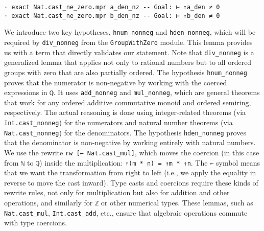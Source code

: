 \begin{example}
\begin{lstlisting}[language=lean]
· exact Nat.cast_ne_zero.mpr a_den_nz -- Goal: ⊢ ↑a_den ≠ 0
· exact Nat.cast_ne_zero.mpr b_den_nz -- Goal: ⊢ ↑b_den ≠ 0
\end{lstlisting}

  We introduce two key hypotheses, \lstinline[language=lean]|hnum_nonneg|
  and \lstinline[language=lean]|hden_nonneg|, which will be required by
  \lstinline[language=lean]|div_nonneg| from the
  \lstinline[language=lean]|GroupWithZero| module.
  This lemma provides us with a term that directly validates our statement.
  Note that \lstinline[language=lean]|div_nonneg| is a generalized lemma that applies
  not only to rational numbers but to all ordered groups with zero that are
  also partially ordered.
  The hypothesis \lstinline[language=lean]|hnum_nonneg| proves that the numerator
  is non-negative by working with the coerced expressions in
  \lstinline[language=lean]|ℚ|. It uses \lstinline[language=lean]|add_nonneg| and
  \lstinline[language=lean]|mul_nonneg|, which are general theorems that work for
  any ordered additive commutative monoid and ordered semiring, respectively.
  The actual reasoning is done using integer-related theorems
  (via \lstinline[language=lean]|Int.cast_nonneg|) for the numerators and natural
  number theorems (via \lstinline[language=lean]|Nat.cast_nonneg|) for the denominators.
  The hypothesis \lstinline[language=lean]|hden_nonneg| proves that the
  denominator is non-negative by working entirely with natural numbers.
  We use the rewrite \lstinline[language=lean]|rw [← Nat.cast_mul]|,
  which moves the coercion (in this case from \lstinline[language=lean]|ℕ|
  to \lstinline[language=lean]|ℚ|) inside the multiplication:
  \lstinline[language=lean]|↑(m * n) = ↑m * ↑n|. The \lstinline[language=lean]|←|
  symbol means that we want the transformation from right to
  left (i.e., we apply the equality in reverse to move the cast inward).
  Type casts and coercions require these kinds of rewrite rules, not only
  for multiplication but also for addition and other operations, and
  similarly for \lstinline[language=lean]|ℤ| or other numerical types.
  These lemmas, such as \lstinline[language=lean]|Nat.cast_mul|,
  \lstinline[language=lean]|Int.cast_add|, etc., ensure that algebraic operations
  commute with type coercions.
\end{example}
